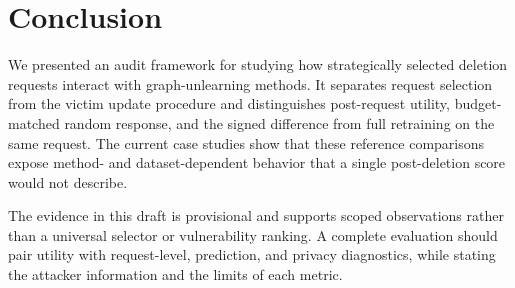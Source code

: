 \section{Conclusion}
\label{sec:conclusion}

We presented an audit framework for studying how strategically selected deletion requests interact with graph-unlearning methods. It separates request selection from the victim update procedure and distinguishes post-request utility, budget-matched random response, and the signed difference from full retraining on the same request. The current case studies show that these reference comparisons expose method- and dataset-dependent behavior that a single post-deletion score would not describe.

The evidence in this draft is provisional and supports scoped observations rather than a universal selector or vulnerability ranking. A complete evaluation should pair utility with request-level, prediction, and privacy diagnostics, while stating the attacker information and the limits of each metric.
